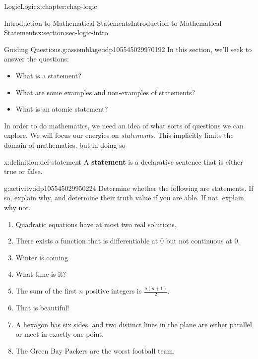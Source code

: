 \documentclass[oneside,10pt,]{book}
\newcommand{\terminology}[1]{\textbf{#1}}
\begin{document}
\begin{chapterptx}{Logic}{}{Logic}{}{}{x:chapter:chap-logic}
%
%
\typeout{************************************************}
\typeout{************************************************}
%
\begin{sectionptx}{Introduction to Mathematical Statements}{}{Introduction to Mathematical Statements}{}{}{x:section:sec-logic-intro}
\begin{assemblage}{Guiding Questions.}{g:assemblage:idp105545029970192}%
In this section, we'll seek to answer the questions: %
\begin{itemize}[label=\textbullet]
\item{}What is a statement?%
\item{}What are some examples and non-examples of statements?%
\item{}What is an atomic statement?%
\end{itemize}
%
\end{assemblage}
In order to do mathematics, we need an idea of what sorts of questions we can explore. We will focus our energies on \emph{statements}. This implicitly limits the domain of mathematics, but in doing so%
\begin{definition}{}{x:definition:def-statement}%
%
A \terminology{statement} is a declarative sentence that is either true or false.%
\end{definition}
\begin{activity}{}{g:activity:idp105545029950224}%
Determine whether the following are statements. If so, explain why, and determine their truth value if you are able. If not, explain why not.%
%
\begin{enumerate}
\item{}Quadratic equations have at most two real solutions.%
\item{}There exists a function that is differentiable at 0 but not continuous at 0.%
\item{}Winter is coming.%
\item{}What time is it?%
\item{}The sum of the first \(n\) positive integers is \(\frac{n(n+1)}{2}\).%
\item{}That is beautiful!%
\item{}A hexagon has six sides, and two distinct lines in the plane are either parallel or meet in exactly one point.%
\item{}The Green Bay Packers are the worst football team.%

\end{enumerate}
\end{activity}
\end{sectionptx}
\end{chapterptx}
\end{document}

